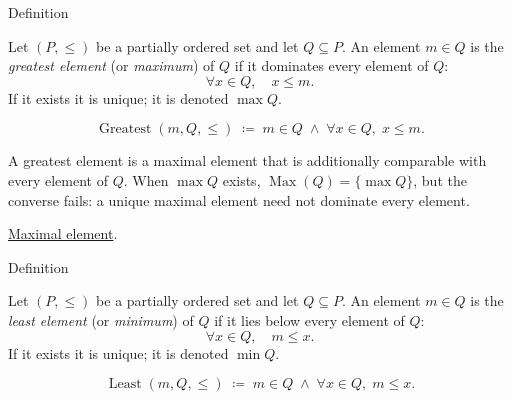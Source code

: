
\begin{definitionbox}{Definition}
\begin{definition}
\label{def:greatest-element}
Let $(P, \leq)$ be a partially ordered set and let $Q \subseteq P$.  An
element $m \in Q$ is the \emph{greatest element} (or \emph{maximum}) of
$Q$ if it dominates every element of $Q$:
\[
\forall x \in Q, \quad x \leq m.
\]
If it exists it is unique; it is denoted $\max Q$.
\end{definition}
\end{definitionbox}

\begin{remark*}
\[
\operatorname{Greatest}(m, Q, \leq)
\;\coloneqq\;
m \in Q \;\land\; \forall x \in Q,\; x \leq m.
\]
\end{remark*}

\begin{remark*}[Interpretation]
A greatest element is a maximal element that is additionally comparable
with every element of $Q$.  When $\max Q$ exists,
$\operatorname{Max}(Q) = \{\max Q\}$, but the converse fails: a unique
maximal element need not dominate every element.
\end{remark*}

\begin{dependencies}
\hyperref[def:maximal-element]{Maximal element}.
\end{dependencies}


\begin{definitionbox}{Definition}
\begin{definition}
\label{def:least-element}
Let $(P, \leq)$ be a partially ordered set and let $Q \subseteq P$.  An
element $m \in Q$ is the \emph{least element} (or \emph{minimum}) of $Q$
if it lies below every element of $Q$:
\[
\forall x \in Q, \quad m \leq x.
\]
If it exists it is unique; it is denoted $\min Q$.
\end{definition}
\end{definitionbox}

\begin{remark*}
\[
\operatorname{Least}(m, Q, \leq)
\;\coloneqq\;
m \in Q \;\land\; \forall x \in Q,\; m \leq x.
\]
\end{remark*}

